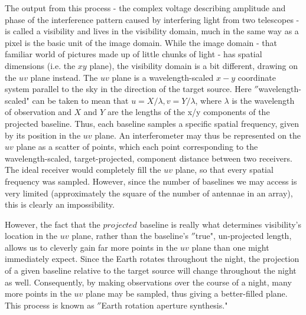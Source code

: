 The output from this process - the complex voltage describing amplitude and phase of the interference pattern caused by interfering light from two telescopes - is called a visibility and lives in the visibility domain, much in the same way as a pixel is the basic unit of the image domain. While the image domain - that familiar world of pictures made up of little chunks of light - has spatial dimensions (i.e. the $xy$ plane), the visibility domain is a bit different, drawing on the $uv$ plane instead. The $uv$ plane is a wavelength-scaled $x-y$ coordinate system parallel to the sky in the direction of the target source. Here $''$wavelength-scaled" can be taken to mean that $u = X/\lambda, v = Y/\lambda$, where $\lambda$ is the wavelength of observation and $X$ and $Y$ are the lengths of the x/y components of the projected baseline. Thus, each baseline samples a specific spatial frequency, given by its position in the $uv$ plane. An interferometer may thus be represented on the $uv$ plane as a scatter of points, which each point corresponding to the wavelength-scaled, target-projected, component distance between two receivers. The ideal receiver would completely fill the $uv$ plane, so that every spatial frequency was sampled. However, since the number of baselines we may access is very limited (approximately the square of the number of antennae in an array), this is clearly an impossibility.

However, the fact that the $projected$ baseline is really what determines visibility's location in the $uv$ plane, rather than the baseline's $''$true", un-projected length, allows us to cleverly gain far more points in the $uv$ plane than one might immediately expect. Since the Earth rotates throughout the night, the projection of a given baseline relative to the target source will change throughout the night as well. Consequently, by making observations over the course of a night, many more points in the $uv$ plane may be sampled, thus giving a better-filled plane. This process is known as $''$Earth rotation aperture synthesis."

